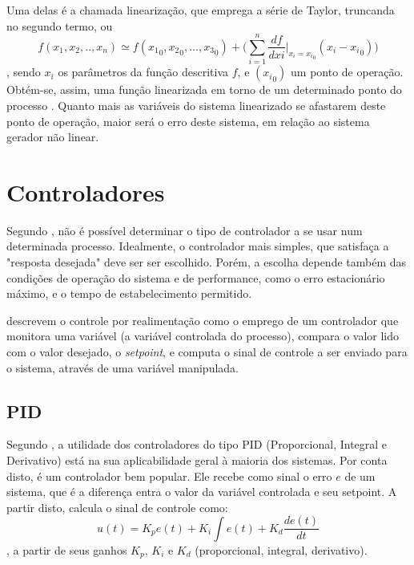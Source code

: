 Uma delas é a chamada linearização, que emprega a série de Taylor, truncanda no segundo termo, ou
\begin{equation}
f(x_1, x_2, .. , x_n) \simeq f({x_1}_0, {x_2}_0, ..., {x_3}_0) + \bigg( \sum_{i=1}^n \frac{df}{dxi}\left.\right|_{x_i = {x_i}_0} ({x_i} - {x_i}_0) \bigg)
\end{equation}
, sendo $x_i$ os parâmetros da função descritiva $f$, e $({x_i}_0)$ um ponto de operação. Obtém-se, assim, uma função linearizada em torno de um determinado ponto do processo . Quanto mais as variáveis do sistema linearizado se afastarem deste ponto de operação, maior será o erro deste sistema, em relação ao sistema gerador não linear.

\section{Controladores}

Segundo , não é possível determinar o tipo de controlador a se usar num determinada processo. Idealmente, o controlador mais simples, que satisfaça a "resposta desejada" deve ser ser escolhido. Porém, a escolha depende também das condições de operação do sistema e de performance, como o erro estacionário máximo, e o tempo de estabelecimento permitido.


 descrevem o controle por realimentação como o emprego de um controlador que monitora uma variável (a variável controlada do processo), compara o valor lido com o valor desejado, o \emph{setpoint}, e computa o sinal de controle a ser enviado para o sistema, através de uma variável manipulada.

\subsection{PID}

Segundo , a utilidade dos controladores do tipo PID (Proporcional, Integral e Derivativo) está na sua aplicabilidade geral à maioria dos sistemas. Por conta disto, é um controlador bem popular. Ele recebe como sinal o erro $e$ de um sistema, que é a diferença entra o valor da variável controlada e seu setpoint. A partir disto, calcula o sinal de controle como:
\begin{equation}
u(t) = K_p e(t) + K_i \int e(t) + K_d \frac{de(t)}{dt}
\label{eq_PID}
\end{equation}
, a partir de seus ganhos $K_p$, $K_i$ e $K_d$ (proporcional, integral, derivativo).

